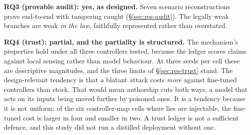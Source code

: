 \textbf{RQ3 (provable audit): yes, as designed.} Seven scenario
reconstructions prove end-to-end with tampering caught
(\S\ref{sec:res-audit}). The legally weak branches are weak \emph{in the
law}, faithfully represented rather than overstated.

\textbf{RQ4 (trust): partial, and the partiality is structured.} The
mechanism's properties hold under all three controllers tested, because
the ledger scores claims against local sensing rather than model
behaviour. At three seeds per cell these are descriptive magnitudes, and
the three limits of \S\ref{sec:res-trust} stand. The design-relevant
tendency is that a blatant attack costs \emph{more} against fine-tuned
controllers than stock. That would mean authorship cuts both ways, a model
that acts on its inputs being moved further by poisoned ones. It is a
tendency because it is not uniform: of the six controller-map cells where
lies are injectable, the fine-tuned cost is larger in four and smaller in
two. A trust ledger is not a sufficient defence, and this study did not
run a distilled deployment without one.
